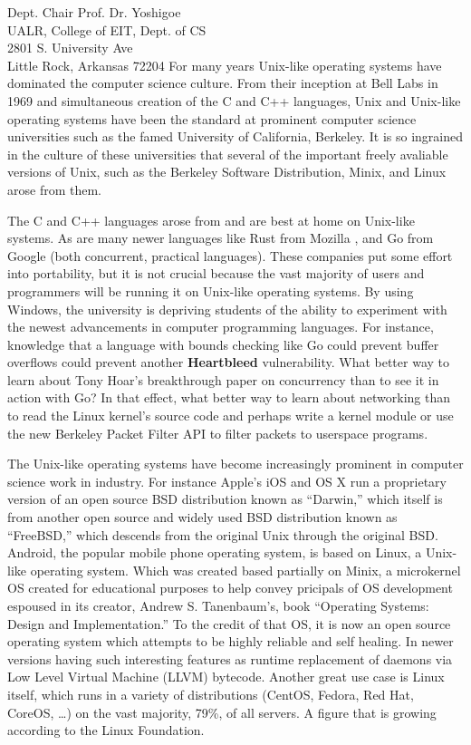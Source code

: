 \documentclass{letter}
\begin{document}
\begin{letter}{
    Dept. Chair Prof. Dr. Yoshigoe \\
    UALR, College of EIT, Dept. of CS \\
    2801 S. University Ave \\
    Little Rock, Arkansas 72204
  }
    For many years Unix-like operating systems have dominated the computer science culture. From their inception at Bell Labs in 1969 and simultaneous creation of the C and C++ languages, Unix and Unix-like operating systems have been the standard at prominent computer science universities such as the famed University of California, Berkeley. It is so ingrained in the culture of these universities that several of the important freely avaliable versions of Unix, such as the Berkeley Software Distribution, Minix, and Linux arose from them.

    The C and C++ languages arose from and are best at home on Unix-like systems. As are many newer languages like Rust from Mozilla \cite{RustLang}, and Go from Google \cite{Golang} (both concurrent, practical languages). These companies put some effort into portability, but it is not crucial because the vast majority of users and programmers will be running it on Unix-like operating systems. By using Windows, the university is depriving students of the ability to experiment with the newest advancements in computer programming languages. For instance, knowledge that a language with bounds checking like Go could prevent buffer overflows could prevent another {\bf Heartbleed} vulnerability. What better way to learn about Tony Hoar's breakthrough paper on concurrency than to see it in action with Go? In that effect, what better way to learn about networking than to read the Linux kernel's source code and perhaps write a kernel module or use the new Berkeley Packet Filter API to filter packets to userspace programs.

    The Unix-like operating systems have become increasingly prominent in computer science work in industry. For instance Apple's iOS and OS X run a proprietary version of an open source BSD distribution known as ``Darwin,'' which itself is from another open source and widely used BSD distribution known as ``FreeBSD,'' which descends from the original Unix through the original BSD. Android, the popular mobile phone operating system, is based on Linux, a Unix-like operating system. Which was created based partially on Minix, a microkernel OS created for educational purposes to help convey pricipals of OS development espoused in its creator, Andrew S. Tanenbaum's, book ``Operating Systems: Design and Implementation.'' To the credit of that OS, it is now an open source operating system which attempts to be highly reliable and self healing. In newer versions having such interesting features as runtime replacement of daemons via Low Level Virtual Machine (LLVM) bytecode. Another great use case is Linux itself, which runs in a variety of distributions (CentOS, Fedora, Red Hat, CoreOS, \ldots) on the vast majority, 79\%, of all servers. A figure that is growing according to the Linux Foundation.


\end{letter}
\end{document}
